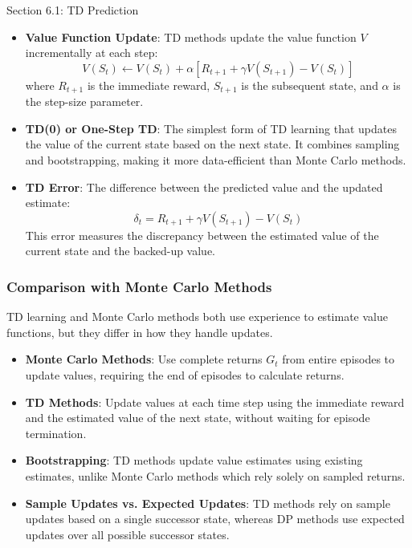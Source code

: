 \begin{notes}{Section 6.1: TD Prediction}
\begin{highlight}[TD Prediction]
        \begin{itemize}
            \item \textbf{Value Function Update}: TD methods update the value function $V$ incrementally at each step:
            \[
            V(S_t) \leftarrow V(S_t) + \alpha [R_{t+1} + \gamma V(S_{t+1}) - V(S_t)]
            \]
            where $R_{t+1}$ is the immediate reward, $S_{t+1}$ is the subsequent state, and $\alpha$ is the step-size parameter.
            \item \textbf{TD(0) or One-Step TD}: The simplest form of TD learning that updates the value of the current state based on the next state. It combines sampling and bootstrapping, making it 
            more data-efficient than Monte Carlo methods.
            \item \textbf{TD Error}: The difference between the predicted value and the updated estimate:
            \[
            \delta_t = R_{t+1} + \gamma V(S_{t+1}) - V(S_t)
            \]
            This error measures the discrepancy between the estimated value of the current state and the backed-up value.
        \end{itemize}
    
    \end{highlight}
    
    \subsubsection*{Comparison with Monte Carlo Methods}
    
    TD learning and Monte Carlo methods both use experience to estimate value functions, but they differ in how they handle updates.
    
    \begin{highlight}
    
        \begin{itemize}
            \item \textbf{Monte Carlo Methods}: Use complete returns $G_t$ from entire episodes to update values, requiring the end of episodes to calculate returns.
            \item \textbf{TD Methods}: Update values at each time step using the immediate reward and the estimated value of the next state, without waiting for episode termination.
            \item \textbf{Bootstrapping}: TD methods update value estimates using existing estimates, unlike Monte Carlo methods which rely solely on sampled returns.
            \item \textbf{Sample Updates vs. Expected Updates}: TD methods rely on sample updates based on a single successor state, whereas DP methods use expected updates over all possible successor 
            states.
        \end{itemize}
    

\end{highlight}
\end{notes}
